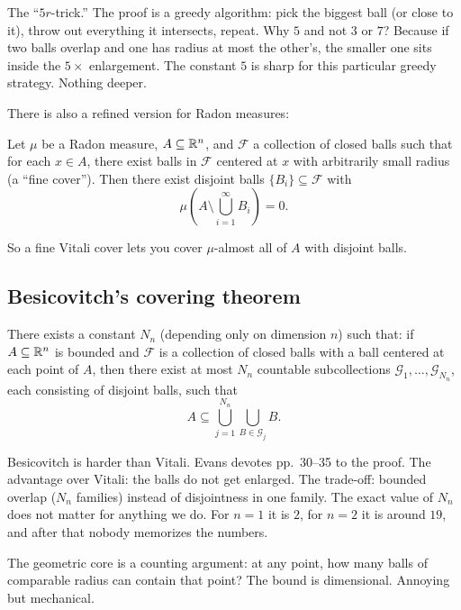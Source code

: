 The ``$5r$-trick.'' The proof is a greedy algorithm: pick the biggest ball
(or close to it), throw out everything it intersects, repeat. Why $5$ and not $3$ or $7$?
Because if two balls overlap and one has radius at most the other's, the
smaller one sits inside the $5\times$ enlargement. The constant $5$ is sharp for this particular greedy strategy. Nothing deeper.

There is also a refined version for Radon measures:

\begin{theorem}%
\label{thm:vitali-radon}
Let $\mu$ be a Radon measure, $A \subseteq \mathbb{R}^n$, and $\mathcal{F}$ a
collection of closed balls such that for each $x \in A$, there exist
balls in $\mathcal{F}$ centered at $x$ with arbitrarily small radius (a
``fine cover''). Then there exist disjoint balls
$\{B_i\} \subseteq \mathcal{F}$ with
\[
  \mu\!\left(A \setminus \bigcup_{i=1}^\infty B_i\right) = 0.
\]
\end{theorem}

So a fine Vitali cover lets you cover $\mu$-almost all of $A$ with
disjoint balls.


\subsection{Besicovitch's covering theorem}\label{subsec:besicovitch}

\begin{theorem}[Besicovitch]\label{thm:besicovitch}
There exists a constant $N_n$ (depending only on dimension $n$) such
that: if $A \subseteq \mathbb{R}^n$ is bounded and $\mathcal{F}$ is a collection
of closed balls with a ball centered at each point of $A$, then there
exist at most $N_n$ countable subcollections
$\mathcal{G}_1, \ldots, \mathcal{G}_{N_n}$, each consisting of disjoint
balls, such that
\[
  A \subseteq \bigcup_{j=1}^{N_n}
    \bigcup_{B \in \mathcal{G}_j} B.
\]
\end{theorem}

Besicovitch is harder than Vitali. Evans devotes pp.\ 30--35 to the proof. The advantage over Vitali: the balls
do not get enlarged. The trade-off: bounded overlap ($N_n$
families) instead of disjointness in one family. The exact value of $N_n$
does not matter for anything we do. For $n=1$ it is $2$, for $n=2$ it is around $19$, and after that nobody memorizes the numbers.

The geometric core is a counting argument: at any point,
how many balls of comparable radius can contain that point? The bound is dimensional. Annoying but mechanical.

